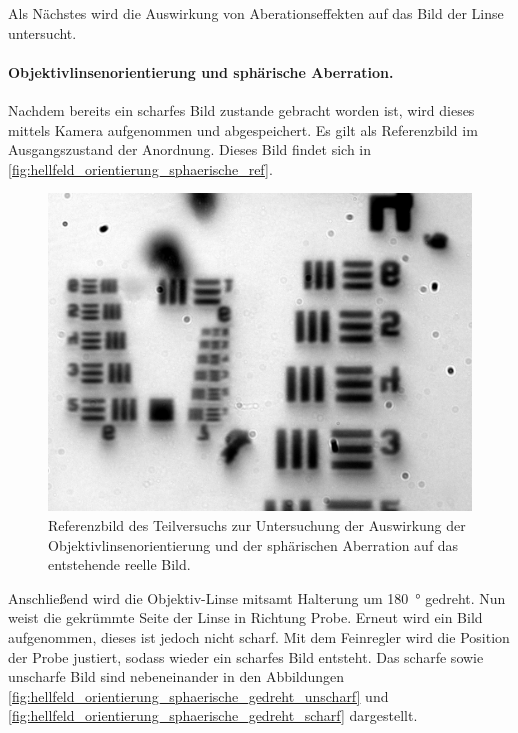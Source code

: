 \documentclass[ngerman]{scrartcl}
\begin{document}
Als Nächstes wird die Auswirkung von Aberationseffekten auf das Bild der Linse untersucht.

\paragraph{Objektivlinsenorientierung und sphärische Aberration.}
Nachdem bereits ein scharfes Bild zustande gebracht worden ist, wird dieses mittels Kamera aufgenommen und abgespeichert. Es gilt als Referenzbild im Ausgangszustand der Anordnung. Dieses Bild findet sich in \autoref{fig:hellfeld_orientierung_sphaerische_ref}.
%
\begin{figure}[H]
    \centering
    \begin{samepage}
        \includegraphics[width=0.475\linewidth]{fig/Versuch3/hellfeld_3.1_vorher.jpg}
        \caption[Hellfeld Orientierung+sphärische Ab.]{Referenzbild des Teilversuchs zur Untersuchung der Auswirkung der Objektivlinsenorientierung und der sphärischen Aberration auf das entstehende reelle Bild.}
        \label{fig:hellfeld_orientierung_sphaerische_ref}
    \end{samepage}
\end{figure}
%
Anschließend wird die Objektiv-Linse mitsamt Halterung um \SI{180}{\degree} gedreht. Nun weist die gekrümmte Seite der Linse in Richtung Probe. Erneut wird ein Bild aufgenommen, dieses ist jedoch nicht scharf. Mit dem Feinregler wird die Position der Probe justiert, sodass wieder ein scharfes Bild entsteht. Das scharfe sowie unscharfe Bild sind nebeneinander in den Abbildungen \ref{fig:hellfeld_orientierung_sphaerische_gedreht_unscharf} und \ref{fig:hellfeld_orientierung_sphaerische_gedreht_scharf} dargestellt.
%
\setcapindent{0pt}
\end{document}
